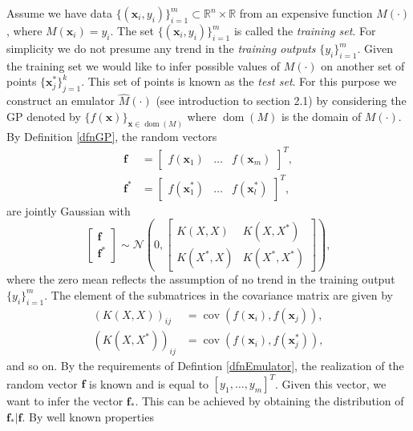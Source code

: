 \documentclass{sfuthesis}
\newcommand{\x}{\textbf{x}}
\DeclareMathOperator*{\cov}{cov}
\DeclareMathOperator{\dom}{dom}
\begin{document}
Assume  we have  data $\{(\textbf{x}_{i},y_{i})\}_{i=1}^{m}\subset\mathbb{R}^{n}\times\mathbb{R}$ 
 from an expensive function  $M(\cdot)$,
where $M(\textbf{x}_{i})=y_{i}$. The set $\{(\textbf{x}_{i},y_{i})\}_{i=1}^{m}$ is called
the \textit{training set}. For
simplicity we do not presume any trend in the \textit{training outputs} $\{y_{i}\}_{i=1}^{m}$. Given the training set
we would like to infer  possible values of $M(\cdot)$ on another set of points 
$\{\textbf{x}_{j}^{*}\}_{j=1}^{k}$. This set of points  is known as the \textit{test set}.
For this purpose we construct an emulator $\widehat{M}(\cdot)$ (see introduction to section 2.1) by
considering the GP denoted by $\{f(\textbf{x})\}_{\x\in\dom(M)}$
 where $\dom(M)$ 
is  the domain of $M(\cdot)$.
 By
Definition \ref{dfnGP}, the random vectors
\begin{align*}
\textbf{f}&=\begin{bmatrix}f(\textbf{x}_{1}) & \ldots & f(\textbf{x}_{m}) \end{bmatrix}^{T}, \\
\textbf{f}^{*}&=\begin{bmatrix}f(\textbf{x}_{1}^{*}) & \ldots & f(\textbf{x}_{l}^{*}) \end{bmatrix}^{T},
\end{align*}
are  jointly Gaussian with
\begin{equation}\label{eqnconditional}
\begin{bmatrix}
\textbf{f} \\
\textbf{f}^{*}
\end{bmatrix}\sim\mathscr{N}\left(0,\begin{bmatrix} K(X,X) & K(X,X^{*}) \\
						    K(X^{*},X) & K(X^{*},X^{*}) \end{bmatrix}
\right),
\end{equation}	
where the zero mean reflects the assumption of no  trend in the training output $\{y_{i}\}_{i=1}^{m}$.
The element of the submatrices in the covariance matrix are given by
\begin{align*}
(K(X,X))_{ij}&=\cov(f(\x_{i}),f(\x_{j})),\\ 
(K(X,X^{*}))_{ij}&=\cov(f(\textbf{x}_{i}),f(\x_{j}^{*})),
\end{align*}
and so on.
By the requirements of Defintion \ref{dfnEmulator},
 the realization of the random vector $\textbf{f}$ is known and is equal to $[y_{1},\ldots,y_{m}]^{T}$.  
Given this vector, we want to  infer  the vector $\textbf{f}_{*}$.
This can be achieved by obtaining the distribution of $\textbf{f}_{*}|\textbf{f}$. By well known properties
\end{document}
